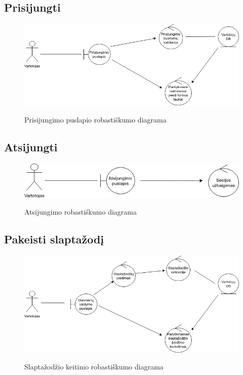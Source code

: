 \documentclass{VUMIFPSkursinis}
\begin{document}
	\subsection{Prisijungti}
		\begin{figure}[H]
		\centering
		\includegraphics[width=\linewidth]{img/prisijungimas.png}
		\label{fig:prisijungimas}
		\caption{Prisijungimo puslapio robastiškumo diagrama}
	\end{figure}
	\subsection{Atsijungti}
		\begin{figure}[H]
		\centering
		\includegraphics[width=\linewidth]{img/atsijungimas.png}
		\label{fig:atsijungti}
		\caption{Atsijungimo robastiškumo diagrama}
	\end{figure}
	\subsection{Pakeisti slaptažodį}
		\begin{figure}[H]
		\centering
		\includegraphics[width=\linewidth]{img/slaptazodis.png}
		\label{fig:slaptazodis}
		\caption{Slaptažodžio keitimo robastiškumo diagrama}
	\end{figure}
\end{document}
